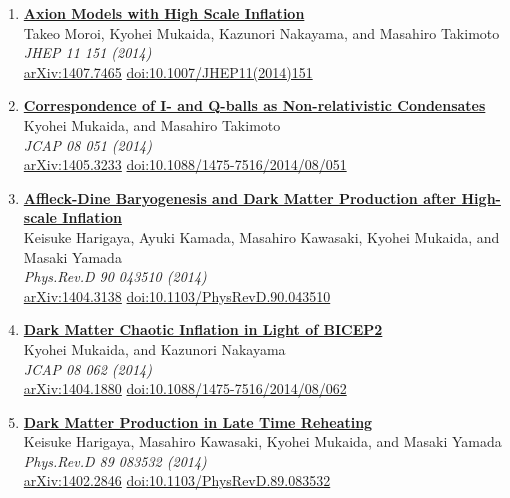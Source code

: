 \begin{enumerate}
\item \textbf{\href{https://arxiv.org/abs/1407.7465}{Axion Models with High Scale Inflation}}\\
Takeo Moroi, Kyohei Mukaida, Kazunori Nakayama, and Masahiro Takimoto\\
\emph{JHEP 11 151 (2014)}
\\ \href{https://arxiv.org/abs/1407.7465}{arXiv:1407.7465} \href{https://doi.org/10.1007/JHEP11(2014)151}{doi:10.1007/JHEP11(2014)151}

\item \textbf{\href{https://arxiv.org/abs/1405.3233}{Correspondence of I- and Q-balls as Non-relativistic Condensates}}\\
Kyohei Mukaida, and Masahiro Takimoto\\
\emph{JCAP 08 051 (2014)}
\\ \href{https://arxiv.org/abs/1405.3233}{arXiv:1405.3233} \href{https://doi.org/10.1088/1475-7516/2014/08/051}{doi:10.1088/1475-7516/2014/08/051}

\item \textbf{\href{https://arxiv.org/abs/1404.3138}{Affleck-Dine Baryogenesis and Dark Matter Production after High-scale Inflation}}\\
Keisuke Harigaya, Ayuki Kamada, Masahiro Kawasaki, Kyohei Mukaida, and Masaki Yamada\\
\emph{Phys.Rev.D 90 043510 (2014)}
\\ \href{https://arxiv.org/abs/1404.3138}{arXiv:1404.3138} \href{https://doi.org/10.1103/PhysRevD.90.043510}{doi:10.1103/PhysRevD.90.043510}

\item \textbf{\href{https://arxiv.org/abs/1404.1880}{Dark Matter Chaotic Inflation in Light of BICEP2}}\\
Kyohei Mukaida, and Kazunori Nakayama\\
\emph{JCAP 08 062 (2014)}
\\ \href{https://arxiv.org/abs/1404.1880}{arXiv:1404.1880} \href{https://doi.org/10.1088/1475-7516/2014/08/062}{doi:10.1088/1475-7516/2014/08/062}

\item \textbf{\href{https://arxiv.org/abs/1402.2846}{Dark Matter Production in Late Time Reheating}}\\
Keisuke Harigaya, Masahiro Kawasaki, Kyohei Mukaida, and Masaki Yamada\\
\emph{Phys.Rev.D 89 083532 (2014)}
\\ \href{https://arxiv.org/abs/1402.2846}{arXiv:1402.2846} \href{https://doi.org/10.1103/PhysRevD.89.083532}{doi:10.1103/PhysRevD.89.083532}


\end{enumerate}
